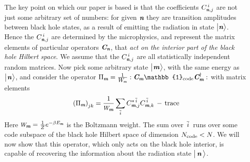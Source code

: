 \documentclass[12pt]{article}%
\def\spc{\hspace{.5pt}}
\def\be{\begin{equation}}
\def\ee{\end{equation}}
\begin{document}
The key point on which our paper is based is that the coefficients $C^{\,i}_{{ \textit{\textbf n}}, j}$ are not just some arbitrary set of numbers: for given ${ \textit{\textbf n}}$ they are transition amplitudes
between black hole states, as a result of emitting the radiation in state $\bigl|{ \textit{\textbf n}}\bigr\rangle$. Hence the $C^{\,i}_{{ \textit{\textbf n}}, j}$ are determined by the microphysics, and
represent the matrix elements of particular operators $\mbox{\textit{\textbf{C}\!\,}}_{ \textit{\textbf n}}$, that {\it act on the interior part of the black hole Hilbert space}. We assume that the $C^{\,i}_{{ \textit{\textbf n}}, j}$ are all statistically independent random matrices.
Now pick some arbitrary state $\bigl|\spc \mom\spc \ra$, with the same energy as $\bigl|\spc \nom \spc \ra$, and consider
 the operator $\Pi_{\mom} = \frac{1}{\pp_\mom} :\cC_\mom \mathbb{1}_{\rm code} \cC^\dag_\mom  :$ with matrix elements
\be
\label{pimats}
\left(\Pi_{\mom}\right)_{jk}= {1\over \pp_\mom} \sum_{\overline{i}} C^{*\, \overline{i}}_{\mom,j} C^{\, \overline{i}}_{\mom,k}  \, -\,
{\rm trace}
\ee
Here $\pp_\mom = \frac 1 Z e^{-\beta E_\mom}$ is the Boltzmann weight. 
The sum over ${\, {\overline{i}}\, }$ runs over some code subspace of the black hole Hilbert space of dimension ${N_{\rm code}} < N$. We will now show that this operator, which only
acts on the black hole interior, is capable of recovering the information about the radiation state $\bigl|\, { \textit{\textbf n}}\,\bigr\rangle$. 
\end{document}
